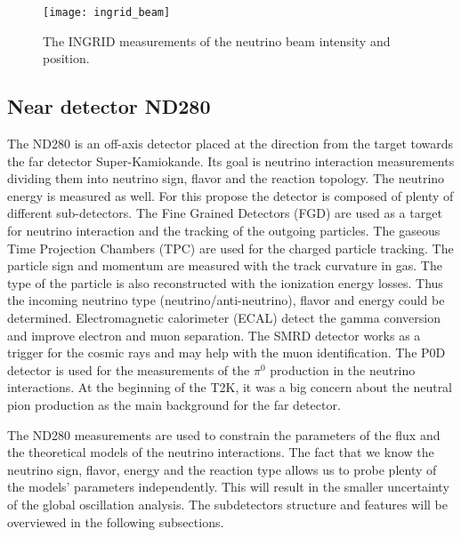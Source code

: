 \documentclass[../main.tex]{subfiles}
\begin{document}
\begin{figure}[!ht]
  \centering
  \texttt{[image: ingrid\_beam]}
  \caption{The INGRID measurements of the neutrino beam intensity and position.}
  \label{fig:t2k:ingrid_beam}
\end{figure}

\subsection{Near detector ND280}
\label{sec:T2K:nd280}
The ND280 is an off-axis detector placed at the direction from the target towards the far detector Super-Kamiokande. Its goal is neutrino interaction measurements dividing them into neutrino sign, flavor and the reaction topology. The neutrino energy is measured as well. For this propose the detector is composed of plenty of different sub-detectors. The Fine Grained Detectors (FGD) are used as a target for neutrino interaction and the tracking of the outgoing particles. The gaseous Time Projection Chambers (TPC) are used for the charged particle tracking. The particle sign and momentum are measured with the track curvature in gas. The type of the particle is also reconstructed with the ionization energy losses. Thus the incoming neutrino type (neutrino/anti-neutrino), flavor and energy could be determined. Electromagnetic calorimeter (ECAL) detect the gamma conversion and improve electron and muon separation. The SMRD detector works as a trigger for the cosmic rays and may help with the muon identification. The P0D detector is used for the measurements of the $\pi^0$ production in the neutrino interactions. At the beginning of the T2K, it was a big concern about the neutral pion production as the main background for the far detector.

The ND280 measurements are used to constrain the parameters of the flux and the theoretical models of the neutrino interactions. The fact that we know the neutrino sign, flavor, energy and the reaction type allows us to probe plenty of the models' parameters independently. This will result in the smaller uncertainty of the global oscillation analysis. The subdetectors structure and features will be overviewed in the following subsections.
\end{document}
